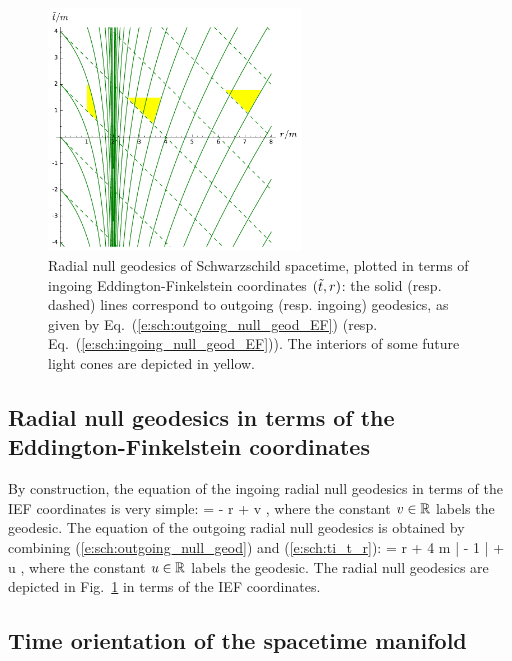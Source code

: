 \begin{figure}
\centerline{\includegraphics[width=0.6\textwidth]{sch_rad_null_geod_EF.pdf}}
\caption[]{\label{f:sch:rad_null_geod_EF} \footnotesize
Radial null geodesics of Schwarzschild spacetime, plotted in terms
of ingoing Eddington-Finkelstein coordinates $({\tilde t},r)$: the solid (resp. dashed) lines
correspond to outgoing (resp. ingoing) geodesics, as given by Eq.~(\ref{e:sch:outgoing_null_geod_EF})
(resp. Eq.~(\ref{e:sch:ingoing_null_geod_EF})). The interiors of some future light
cones are depicted in yellow.}
\end{figure}

\subsection{Radial null geodesics in terms of the Eddington-Finkelstein coordinates}

By construction, the equation of the ingoing radial null geodesics
in terms of the IEF coordinates is very simple:
\be \label{e:sch:ingoing_null_geod_EF}
    \ti = - r + v ,
\ee
where the constant $v\in \mathbb{R}$ labels the geodesic.
The equation of the outgoing radial null geodesics is obtained
by combining (\ref{e:sch:outgoing_null_geod}) and (\ref{e:sch:ti_t_r}):
\be \label{e:sch:outgoing_null_geod_EF}
    \ti = r + 4 m \ln \left|  - 1 \right| + u ,
\ee
where the constant $u\in \mathbb{R}$ labels the geodesic.
The radial null geodesics are depicted in Fig.~\ref{f:sch:rad_null_geod_EF}
in terms of the IEF coordinates.

\subsection{Time orientation of the spacetime manifold} \label{s:sch:time_orientation}

